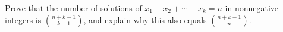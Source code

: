 Prove that the number of solutions of $x_1+x_2+\cdots+x_k=n$ in nonnegative integers is $\binom{n+k-1}{k-1}$, and explain why this also equals $\binom{n+k-1}{n}$.

